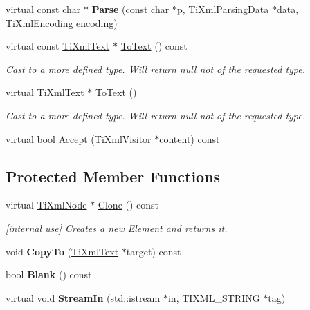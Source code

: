 \begin{DoxyCompactItemize}
\hypertarget{class_ti_xml_text_a8d2dcfa41fc73d3e62dacc2fcf633819}{}\label{class_ti_xml_text_a8d2dcfa41fc73d3e62dacc2fcf633819} 
virtual const char $\ast$ {\bfseries Parse} (const char $\ast$p, \hyperlink{class_ti_xml_parsing_data}{Ti\+Xml\+Parsing\+Data} $\ast$data, Ti\+Xml\+Encoding encoding)
\item 
\hypertarget{class_ti_xml_text_af8973cfd4ca00c5d934cb23e8aa0f5d5}{}\label{class_ti_xml_text_af8973cfd4ca00c5d934cb23e8aa0f5d5} 
virtual const \hyperlink{class_ti_xml_text}{Ti\+Xml\+Text} $\ast$ \hyperlink{class_ti_xml_text_af8973cfd4ca00c5d934cb23e8aa0f5d5}{To\+Text} () const
\begin{DoxyCompactList}\small\item\em Cast to a more defined type. Will return null not of the requested type. \end{DoxyCompactList}\item 
\hypertarget{class_ti_xml_text_ae7c3a8fd3e4dbf6c0c4363a943d72f5b}{}\label{class_ti_xml_text_ae7c3a8fd3e4dbf6c0c4363a943d72f5b} 
virtual \hyperlink{class_ti_xml_text}{Ti\+Xml\+Text} $\ast$ \hyperlink{class_ti_xml_text_ae7c3a8fd3e4dbf6c0c4363a943d72f5b}{To\+Text} ()
\begin{DoxyCompactList}\small\item\em Cast to a more defined type. Will return null not of the requested type. \end{DoxyCompactList}\item 
virtual bool \hyperlink{class_ti_xml_text_af65964326eac4640bfb97d4622fa0de2}{Accept} (\hyperlink{class_ti_xml_visitor}{Ti\+Xml\+Visitor} $\ast$content) const
\end{DoxyCompactItemize}
\subsection*{Protected Member Functions}
\begin{DoxyCompactItemize}
\item 
\hypertarget{class_ti_xml_text_a98a20d7a4f1c1478e25e34921be24bfe}{}\label{class_ti_xml_text_a98a20d7a4f1c1478e25e34921be24bfe} 
virtual \hyperlink{class_ti_xml_node}{Ti\+Xml\+Node} $\ast$ \hyperlink{class_ti_xml_text_a98a20d7a4f1c1478e25e34921be24bfe}{Clone} () const
\begin{DoxyCompactList}\small\item\em \mbox{[}internal use\mbox{]} Creates a new Element and returns it. \end{DoxyCompactList}\item 
\hypertarget{class_ti_xml_text_a480b8e0ad6b7833a73ecf2191195c9b5}{}\label{class_ti_xml_text_a480b8e0ad6b7833a73ecf2191195c9b5} 
void {\bfseries Copy\+To} (\hyperlink{class_ti_xml_text}{Ti\+Xml\+Text} $\ast$target) const
\item 
\hypertarget{class_ti_xml_text_a0fd9005b279def46859b72f336b158da}{}\label{class_ti_xml_text_a0fd9005b279def46859b72f336b158da} 
bool {\bfseries Blank} () const
\item 
\hypertarget{class_ti_xml_text_a261e07cdbd5363f994371320414c17d9}{}\label{class_ti_xml_text_a261e07cdbd5363f994371320414c17d9} 
virtual void {\bfseries Stream\+In} (std\+::istream $\ast$in, T\+I\+X\+M\+L\+\_\+\+S\+T\+R\+I\+NG $\ast$tag)
\end{DoxyCompactItemize}
